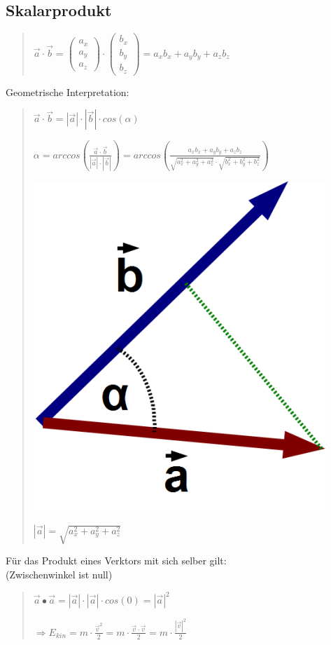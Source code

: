\subsection*{Skalarprodukt}
\begin{verse}
$\vec{a}\cdot\vec{b}=\left(\begin{array}{c}
a_{x}\\
a_{y}\\
a_{z}
\end{array}\right)\cdot\left(\begin{array}{c}
b_{x}\\
b_{y}\\
b_{z}
\end{array}\right)=a_{x}b_{x}+a_{y}b_{y}+a_{z}b_{z}$
\end{verse}
Geometrische Interpretation:
\begin{verse}
$\vec{a}\cdot\vec{b}=|\vec{a}|\cdot|\vec{b}|\cdot cos(\alpha)$

$\alpha=arccos(\frac{\vec{a}\cdot\vec{b}}{|\vec{a}|\cdot|\vec{b}|})=arccos(\frac{a_{x}b_{x}+a_{y}b_{y}+a_{z}b_{z}}{\sqrt{a_{x}^{2}+a_{y}^{2}+a_{z}^{2}}\cdot\sqrt{b_{x}^{2}+b_{y}^{2}+b_{z}^{2}}})$

\includegraphics[scale=0.4]{Energie-Leistung-Potentiale/Skalarprodukt}

$|\vec{a}|=\sqrt{a_{x}^{2}+a_{y}^{2}+a_{z}^{2}}$
\end{verse}
Für das Produkt eines Verktors mit sich selber gilt:\\
(Zwischenwinkel ist null)
\begin{verse}
$\vec{a}\bullet\vec{a}=|\vec{a}|\cdot|\vec{a}|\cdot cos(0)=|\vec{a}|^{2}$

$\Rightarrow E_{kin}=m\cdot\frac{\vec{v}^{2}}{2}=m\cdot\frac{\vec{v}\cdot\vec{v}}{2}=m\cdot\frac{|\vec{v}|^{2}}{2}$
\end{verse}

